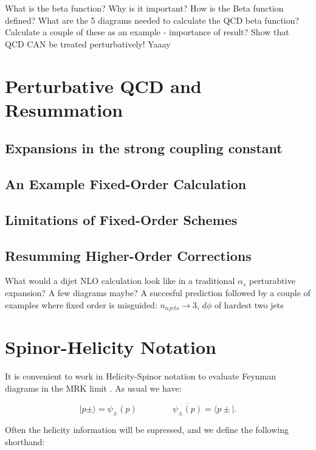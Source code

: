 	What is the beta function? Why is it important? How is the Beta function defined?  What are the 5 diagrams needed to calculate the QCD beta function? Calculate a couple of these as an example - importance of result? Show that QCD CAN be treated perturbatively! Yaaay

\section{Perturbative QCD and Resummation}

	\subsection{Expansions in the strong coupling constant}

	\subsection{An Example Fixed-Order Calculation}

	\subsection{Limitations of Fixed-Order Schemes}

	\subsection{Resumming Higher-Order Corrections}

	What would a dijet NLO calculation look like in a traditional $\alpha_s$ perturabtive expansion? A few diagrams maybe? A succesful prediction followed by a couple of examples where fixed order is misguided: $n_{njets}\rightarrow3$, $d\phi$ of hardest two jets

\section{Spinor-Helicity Notation}
\label{sec:SpinorHelicity}

	It is convenient to work in Helicity-Spinor notation to evaluate Feynman diagrams in the MRK limit \cite{efficiently}.  As usual we have:

	\begin{equation}
	\mid p\pm\rangle = \psi_\pm(p) \hspace{50pt} \overline{\psi_\pm(p)} = \langle p\pm\mid.
	\end{equation}

	Often the helicity information will be supressed, and we define the following shorthand:


